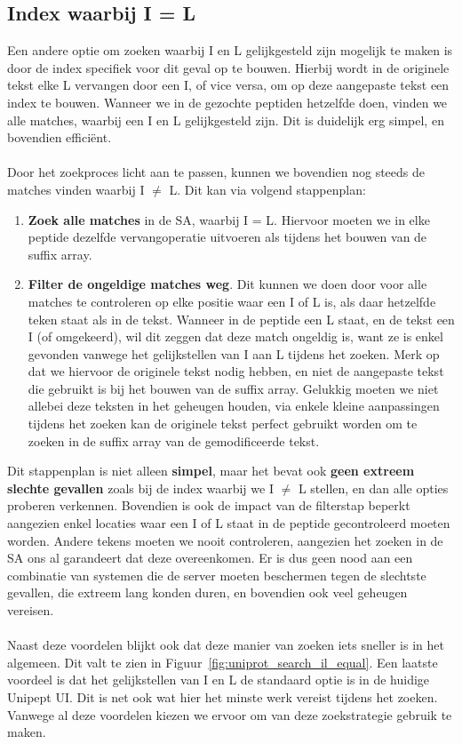 \subsection{Index waarbij I = L}
Een andere optie om zoeken waarbij I en L gelijkgesteld zijn mogelijk te maken is door de index specifiek voor dit geval op te bouwen.
Hierbij wordt in de originele tekst elke L vervangen door een I, of vice versa, om op deze aangepaste tekst een index te bouwen.
Wanneer we in de gezochte peptiden hetzelfde doen, vinden we alle matches, waarbij een I en L gelijkgesteld zijn.
Dit is duidelijk erg simpel, en bovendien efficiënt.
\\ \\
Door het zoekproces licht aan te passen, kunnen we bovendien nog steeds de matches vinden waarbij I $\neq$ L\@.
Dit kan via volgend stappenplan:
\begin{enumerate}
    \item \textbf{Zoek alle matches} in de SA, waarbij I = L\@.
    Hiervoor moeten we in elke peptide dezelfde vervangoperatie uitvoeren als tijdens het bouwen van de suffix array.
    \item \textbf{Filter de ongeldige matches weg}.
    Dit kunnen we doen door voor alle matches te controleren op elke positie waar een I of L is, als daar hetzelfde teken staat als in de tekst.
    Wanneer in de peptide een L staat, en de tekst een I (of omgekeerd), wil dit zeggen dat deze match ongeldig is, want ze is enkel gevonden vanwege het gelijkstellen van I aan L tijdens het zoeken.
    Merk op dat we hiervoor de originele tekst nodig hebben, en niet de aangepaste tekst die gebruikt is bij het bouwen van de suffix array.
    Gelukkig moeten we niet allebei deze teksten in het geheugen houden, via enkele kleine aanpassingen tijdens het zoeken kan de originele tekst perfect gebruikt worden om te zoeken in de suffix array van de gemodificeerde tekst.
\end{enumerate}

Dit stappenplan is niet alleen \textbf{simpel}, maar het bevat ook \textbf{geen extreem slechte gevallen} zoals bij de index waarbij we I $\neq$ L stellen, en dan alle opties proberen verkennen.
Bovendien is ook de impact van de filterstap beperkt aangezien enkel locaties waar een I of L staat in de peptide gecontroleerd moeten worden.
Andere tekens moeten we nooit controleren, aangezien het zoeken in de SA ons al garandeert dat deze overeenkomen.
Er is dus geen nood aan een combinatie van systemen die de server moeten beschermen tegen de slechtste gevallen, die extreem lang konden duren, en bovendien ook veel geheugen vereisen.
\\ \\
Naast deze voordelen blijkt ook dat deze manier van zoeken iets sneller is in het algemeen.
Dit valt te zien in Figuur~\ref{fig:uniprot_search_il_equal}.
Een laatste voordeel is dat het gelijkstellen van I en L de standaard optie is in de huidige Unipept UI\@.
Dit is net ook wat hier het minste werk vereist tijdens het zoeken.
Vanwege al deze voordelen kiezen we ervoor om van deze zoekstrategie gebruik te maken.

